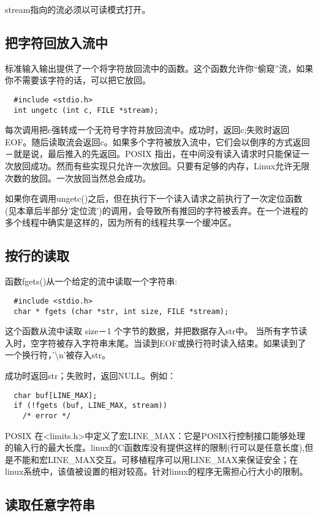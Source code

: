 stream指向的流必须以可读模式打开。

\subsection{把字符回放入流中}

标准输入输出提供了一个将字符放回流中的函数。这个函数允许你“偷窥”流，如果你不需要该字符的话，可以把它放回。
\begin{lstlisting}
  #include <stdio.h>
  int ungetc (int c, FILE *stream);
\end{lstlisting}

每次调用把c强转成一个无符号字符并放回流中。成功时，返回c;失败时返回EOF。随后读取流会返回c。如果多个字符被放入流中，它们会以倒序的方式返回－就是说，最后推入的先返回。POSIX 指出，在中间没有读入请求时只能保证一次放回成功。然而有些实现只允许一次放回。只要有足够的内存，Linux允许无限次数的放回。一次放回当然总会成功。

如果你在调用ungetc()之后，但在执行下一个读入请求之前执行了一次定位函数(见本章后半部分'定位流')的调用，会导致所有推回的字符被丢弃。在一个进程的多个线程中确实是这样的，因为所有的线程共享一个缓冲区。

\subsection{按行的读取}

函数fgets()从一个给定的流中读取一个字符串:
\begin{lstlisting}
  #include <stdio.h>
  char * fgets (char *str, int size, FILE *stream);
\end{lstlisting}

这个函数从流中读取 size－1 个字节的数据，并把数据存入str中。 当所有字节读入时，空字符被存入字符串末尾。当读到EOF或换行符时读入结束。如果读到了一个换行符，'{\textbackslash}n'被存入str。

成功时返回str；失败时，返回NULL。例如：
\begin{lstlisting}
  char buf[LINE_MAX];
  if (!fgets (buf, LINE_MAX, stream))
    /* error */
\end{lstlisting}

POSIX 在<limits.h>中定义了宏LINE\_MAX：它是POSIX行控制接口能够处理的输入行的最大长度。linux的C函数库没有提供这样的限制(行可以是任意长度),但是不能和宏LINE\_MAX交互。可移植程序可以用LINE\_MAX来保证安全；在linux系统中，该值被设置的相对较高。针对linux的程序无需担心行大小的限制。

\subsection{读取任意字符串}

